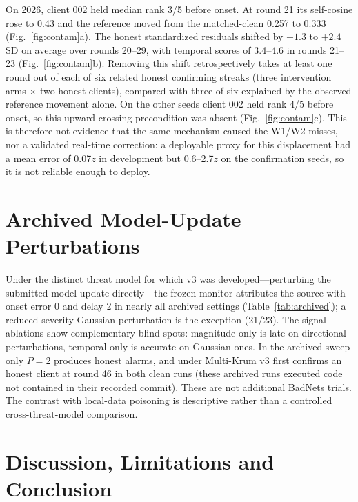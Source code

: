 \documentclass{article}
\begin{document}
On 2026, client 002 held median rank 3/5 before onset. At round 21 its self-cosine rose to 0.43 and the reference moved from the matched-clean 0.257 to 0.333 (Fig.~\ref{fig:contam}a). The honest standardized residuals shifted by $+1.3$ to $+2.4$ SD on average over rounds 20--29, with temporal scores of 3.4--4.6 in rounds 21--23 (Fig.~\ref{fig:contam}b). Removing this shift retrospectively takes at least one round out of each of six related honest confirming streaks (three intervention arms $\times$ two honest clients), compared with three of six explained by the observed reference movement alone. On the other seeds client 002 held rank 4/5 before onset, so this upward-crossing precondition was absent (Fig.~\ref{fig:contam}c). This is therefore not evidence that the same mechanism caused the W1/W2 misses, nor a validated real-time correction: a deployable proxy for this displacement had a mean error of 0.07$z$ in development but 0.6--2.7$z$ on the confirmation seeds, so it is not reliable enough to deploy.

\section{Archived Model-Update Perturbations}
\label{sec:archived}



Under the distinct threat model for which v3 was developed---perturbing the submitted model update directly---the frozen monitor attributes the source with onset error 0 and delay 2 in nearly all archived settings (Table~\ref{tab:archived}); a reduced-severity Gaussian perturbation is the exception (21/23). The signal ablations show complementary blind spots: magnitude-only is late on directional perturbations, temporal-only is accurate on Gaussian ones. In the archived sweep only $P=2$ produces honest alarms, and under Multi-Krum v3 first confirms an honest client at round 46 in both clean runs (these archived runs executed code not contained in their recorded commit). These are not additional BadNets trials. The contrast with local-data poisoning is descriptive rather than a controlled cross-threat-model comparison.

\section{Discussion, Limitations and Conclusion}
\label{sec:conclusion}
\end{document}
